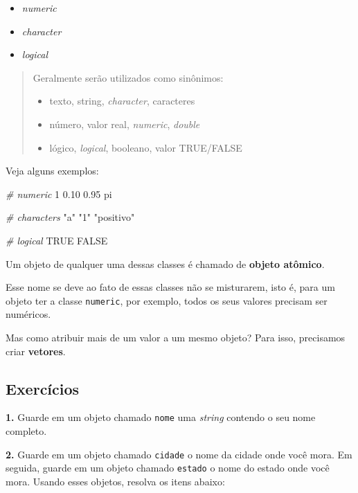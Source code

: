 \documentclass[
]{book}
\newenvironment{Shaded}{\begin{snugshade}}{\end{snugshade}}
\newcommand{\CommentTok}[1]{\textcolor[rgb]{0.56,0.35,0.01}{\textit{#1}}}
\newcommand{\ConstantTok}[1]{\textcolor[rgb]{0.00,0.00,0.00}{#1}}
\newcommand{\DecValTok}[1]{\textcolor[rgb]{0.00,0.00,0.81}{#1}}
\newcommand{\FloatTok}[1]{\textcolor[rgb]{0.00,0.00,0.81}{#1}}
\newcommand{\NormalTok}[1]{#1}
\newcommand{\StringTok}[1]{\textcolor[rgb]{0.31,0.60,0.02}{#1}}
\providecommand{\tightlist}{%
  \setlength{\itemsep}{0pt}\setlength{\parskip}{0pt}}
\begin{document}
\begin{itemize}
\tightlist
\item
  \emph{numeric}
\item
  \emph{character}
\item
  \emph{logical}
\end{itemize}

\begin{quote}
Geralmente serão utilizados como sinônimos:

\begin{itemize}
\tightlist
\item
  texto, string, \emph{character}, caracteres
\item
  número, valor real, \emph{numeric}, \emph{double}
\item
  lógico, \emph{logical}, booleano, valor TRUE/FALSE
\end{itemize}
\end{quote}

Veja alguns exemplos:

\begin{Shaded}
\begin{Highlighting}[]
\CommentTok{\# numeric}
\DecValTok{1}
\FloatTok{0.10}
\FloatTok{0.95}
\NormalTok{pi}

\CommentTok{\# characters}
\StringTok{"a"}
\StringTok{"1"}
\StringTok{"positivo"}

\CommentTok{\# logical}
\ConstantTok{TRUE}
\ConstantTok{FALSE}
\end{Highlighting}
\end{Shaded}

Um objeto de qualquer uma dessas classes é chamado de \textbf{objeto atômico}.

Esse nome se deve ao fato de essas classes não se misturarem, isto é, para um objeto ter a classe \texttt{numeric}, por exemplo, todos os seus valores precisam ser numéricos.

Mas como atribuir mais de um valor a um mesmo objeto? Para isso, precisamos criar \textbf{vetores}.

\hypertarget{exercuxedcios-2}{%
\subsection{Exercícios}\label{exercuxedcios-2}}

\textbf{1.} Guarde em um objeto chamado \texttt{nome} uma \emph{string} contendo o seu nome completo.

\textbf{2.} Guarde em um objeto chamado \texttt{cidade} o nome da cidade onde você mora. Em seguida, guarde em um objeto chamado \texttt{estado} o nome do estado onde você mora. Usando esses objetos, resolva os itens abaixo:
\end{document}
